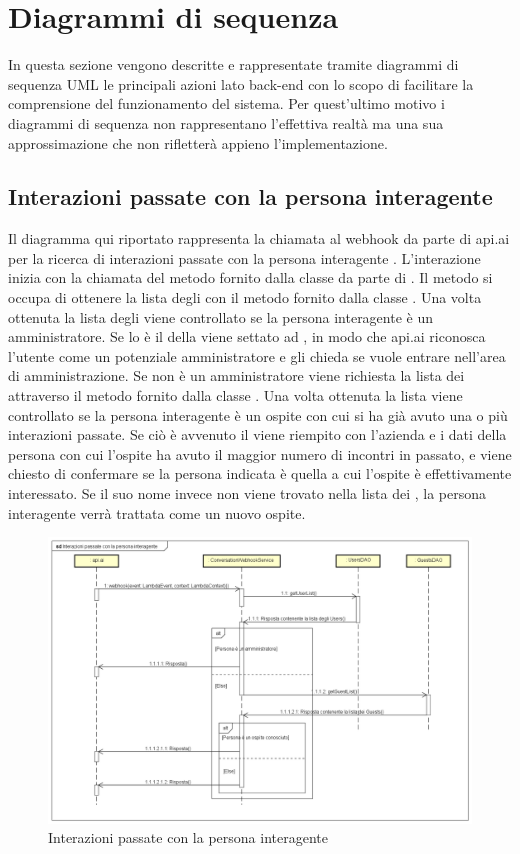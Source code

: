 \section{Diagrammi di sequenza}
In questa sezione vengono descritte e rappresentate tramite diagrammi di sequenza UML le principali azioni lato back-end con lo scopo di facilitare la comprensione del funzionamento del sistema. Per quest'ultimo motivo i diagrammi di sequenza non rappresentano l'effettiva realtà ma una sua approssimazione che non rifletterà appieno l'implementazione.
\subsection{Interazioni passate con la persona interagente}
Il diagramma qui riportato rappresenta la chiamata al webhook da parte di api.ai per la ricerca di interazioni passate con la persona interagente . L'interazione inizia con la chiamata del metodo  fornito dalla classe  da parte di . Il metodo si occupa di ottenere la lista degli  con il metodo  fornito dalla classe . Una volta ottenuta la lista degli  viene controllato se la persona interagente è un amministratore. Se lo è il  della  viene settato ad , in modo che api.ai riconosca l'utente come un potenziale amministratore e gli chieda se vuole entrare nell'area di amministrazione. Se non è un amministratore viene richiesta la lista dei  attraverso il metodo  fornito dalla classe . Una volta ottenuta la lista viene controllato se la persona interagente è un ospite con cui si ha già avuto una o più interazioni passate. Se ciò è avvenuto il  viene riempito con l'azienda e i dati della persona con cui l'ospite ha avuto il maggior numero di incontri in passato, e viene chiesto di confermare se la persona indicata è quella a cui l'ospite è effettivamente interessato. Se il suo nome invece non viene trovato nella lista dei , la persona interagente verrà trattata come un nuovo ospite.
\begin{figure}[h] \centering \includegraphics[width=\textwidth,height=\textheight,keepaspectratio]{images/diagrams/back-end/Ufficial_Backend/Interazionipassateconlapersonainteragente.png}
\caption{Interazioni passate con la persona interagente}
\end{figure}
